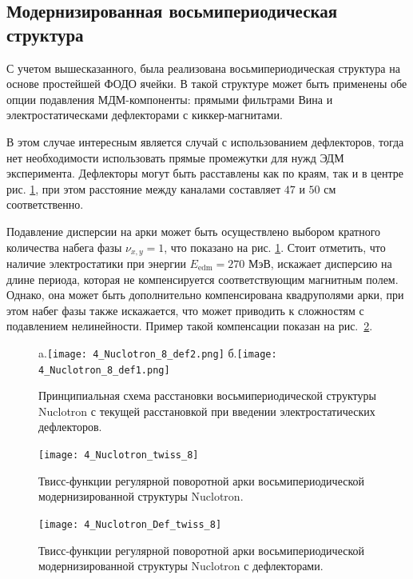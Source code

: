 	\subsection{Модернизированная восьмипериодическая структура}\label{sec:EDM/optics/8period}

\par С учетом вышесказанного, была реализована восьмипериодическая структура на основе простейшей ФОДО ячейки. В такой структуре может быть применены обе опции подавления МДМ-компоненты: прямыми фильтрами Вина и электростатическами дефлекторами с киккер-магнитами.

\par В этом случае интересным является случай с использованием дефлекторов, тогда нет необходимости использовать прямые промежутки для нужд ЭДМ эксперимента. Дефлекторы могут быть расставлены как по краям, так и в центре рис. \ref{fig:4_Nuclotron_8}, при этом расстояние между каналами составляет $47$ и $50$ см соответственно.

\par Подавление дисперсии на арки может быть осуществлено выбором кратного количества набега фазы $\nu_{x,y} = 1$, что показано на рис. \ref{fig:4_Nuclotron_8}. Стоит отметить, что наличие электростатики при энергии $E_{\textrm{edm}}=270$ МэВ, искажает дисперсию на длине периода, которая не компенсируется соответствующим магнитным полем. Однако, она может быть дополнительно компенсирована квадруполями арки, при этом набег фазы также искажается, что может приводить к сложностям с подавлением нелинейности. Пример такой компенсации показан на рис.~\ref{fig:4_Nuclotron_twiss_8}.

\begin{figure}[!h]
  \centering
   a.\texttt{[image: 4\_Nuclotron\_8\_def2.png]}
   б.\texttt{[image: 4\_Nuclotron\_8\_def1.png]}
   \caption{Принципиальная схема расстановки восьмипериодической структуры Nuclotron с текущей расстановкой при введении электростатических дефлекторов.}
   \label{fig:4_Nuclotron_8}
\end{figure}

\begin{figure}[!h]
  \centering
   \texttt{[image: 4\_Nuclotron\_twiss\_8]}
   \caption{Твисс-функции регулярной поворотной арки восьмипериодической модернизированной структуры Nuclotron.}
   \label{fig:4_Nuclotron_twiss_8}
\end{figure}

\begin{figure}[!h]
  \centering
   \texttt{[image: 4\_Nuclotron\_Def\_twiss\_8]}
   \caption{Твисс-функции регулярной поворотной арки восьмипериодической модернизированной структуры Nuclotron с дефлекторами.}
   \label{fig:4_Nuclotron_Def_twiss_8}
\end{figure}

